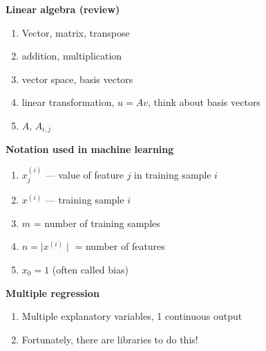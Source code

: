 \textbf{Linear algebra (review)}
\begin{enumerate}
\item Vector, matrix, transpose
\item addition, multiplication
\item vector space, basis vectors
\item linear transformation, $u=Av$, think about basis vectors
\item $A$, $A_{i,j}$
\end{enumerate}

\textbf{Notation used in machine learning}
\begin{enumerate}
\item $x_j^{(i)}$ --- value of feature $j$ in training sample $i$
\item $x^{(i)}$ --- training sample $i$
\item $m$ = number of training samples
\item $n = \mid x^{(i)} \mid$ = number of features
\item $x_0 = 1$ (often called bias)
\end{enumerate}

\textbf{Multiple regression}
\begin{enumerate}
\item Multiple explanatory variables, 1 continuous output
\item Fortunately, there are libraries to do this!
\end{enumerate}


